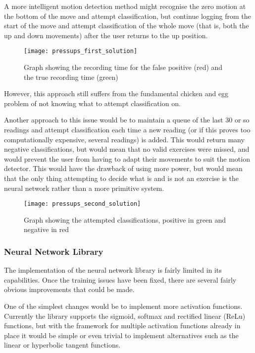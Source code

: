 \documentclass[a4paper]{article}
\begin{document}
A more intelligent motion detection method might recognise the zero motion at the bottom of the move and attempt classification, but continue logging from the start of the move and attempt classification of the whole move (that is, both the up and down movements) after the user returns to the up position.

\begin{figure}[H]
    \centering
        \texttt{[image: pressups\_first\_solution]}
        \caption{Graph showing the recording time for the false positive (red) and the true recording time (green)}
        \label{fig:pu_first_solution}
\end{figure}

However, this approach still suffers from the fundamental chicken and egg problem of not knowing what to attempt classification on.

Another approach to this issue would be to maintain a queue of the last 30 or so readings and attempt classification each time a new reading (or if this proves too computationally expensive, several readings) is added. 
This would return many negative classifications, but would mean that no valid exercises were missed, and would prevent the user from having to adapt their movements to suit the motion detector. This would have the drawback of using more power, but would mean that the only thing attempting to decide what is and is not an exercise is the neural network rather than a more primitive system.

\begin{figure}[H]
    \centering
        \texttt{[image: pressups\_second\_solution]}
        \caption{Graph showing the attempted classifications, positive in green and negative in red}
        \label{fig:pu_second_solution}
\end{figure}

\subsubsection{Neural Network Library}

The implementation of the neural network library is fairly limited in its capabilities. Once the training issues have been fixed, there are several fairly obvious improvements that could be made.

One of the simplest changes would be to implement more activation functions. Currently the library supports the sigmoid, softmax  and rectified linear (ReLu) functions, but with the framework for multiple activation functions already in place it would be simple or even trivial to implement alternatives such as the linear or hyperbolic tangent functions.
\end{document}
